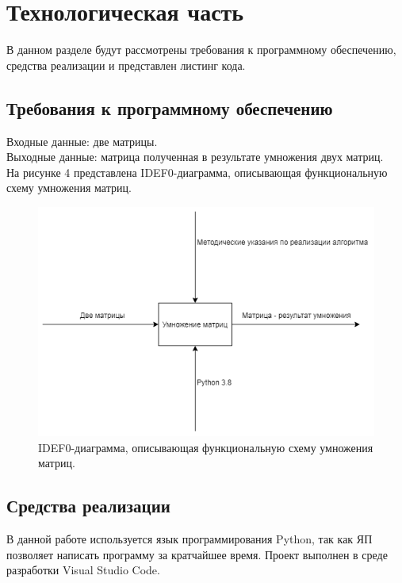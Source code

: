 \documentclass[a4paper, 12pt]{article}
\begin{document}
\section{Технологическая часть}
\begin{flushleft}
	\hspace*{5mm} В данном разделе будут рассмотрены требования к программному обеспечению, средства реализации и представлен листинг кода.
	\subsection{Требования к программному обеспечению}
	\hspace*{5mm} Входные данные: две матрицы.
	\\ \hspace*{5mm} Выходные данные: матрица полученная в результате умножения двух матриц.
	\\ \hspace*{5mm} На рисунке 4 представлена IDEF0-диаграмма, описывающая функциональную схему умножения матриц.
	\begin{figure}[h!]
		\centering \includegraphics[scale=0.8]{диаграмма}
		\centering\caption{IDEF0-диаграмма, описывающая функциональную схему умножения матриц.}
	\end{figure}
	\clearpage
	\newpage
	\subsection{Средства реализации}
	\hspace*{5mm} В данной работе используется язык программирования Python, так как ЯП позволяет написать программу за кратчайшее время. Проект выполнен в среде разработки Visual Studio Code.

\end{flushleft}
\end{document}
